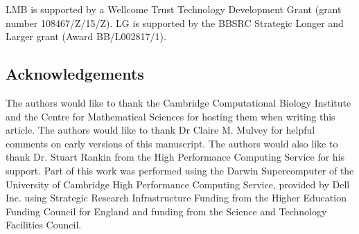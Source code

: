 LMB is supported by a Wellcome Trust Technology Development Grant
(grant number 108467/Z/15/Z). LG is supported by the BBSRC Strategic
Longer and Larger grant (Award BB/L002817/1).


\subsection*{Acknowledgements}

The authors would like to thank the Cambridge Computational Biology
Institute and the Centre for Mathematical Sciences for hosting them
when writing this article. The authors would like to thank Dr Claire
M. Mulvey for helpful comments on early versions of this
manuscript. The authors would also like to thank Dr. Stuart Rankin
from the High Performance Computing Service for his support. Part of
this work was performed using the Darwin Supercomputer of the
University of Cambridge High Performance Computing Service, provided
by Dell Inc. using Strategic Research Infrastructure Funding from the
Higher Education Funding Council for England and funding from the
Science and Technology Facilities Council.
